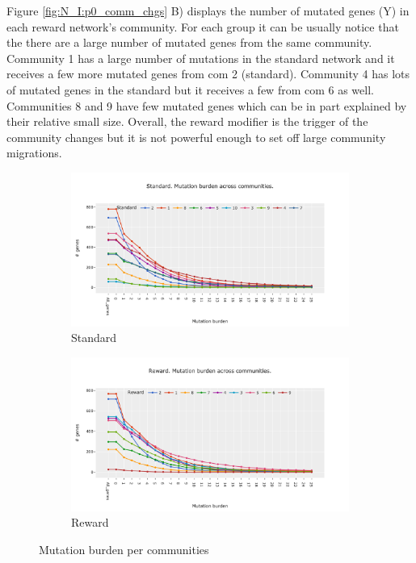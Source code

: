 {Figure \ref{fig:N_I:p0_comm_chgs} B) displays the number of mutated genes (Y) in each reward network's community. For each group it can be usually notice that the there are a large number of mutated genes from the same community. Community 1 has a large number of mutations in the standard network and it receives a few more mutated genes from com 2 (standard). Community 4 has lots of mutated genes in the standard but it receives a few from com 6 as well. Communities 8 and 9 have few mutated genes which can be in part explained by their relative small size. Overall, the reward modifier is the trigger of the community changes but it is not powerful enough to set off large community migrations.


\begin{figure}[!htb]
    \hfill
    \begin{subfigure}[b]{0.49\textwidth}
        \centering
        \includegraphics[width=\textwidth,keepaspectratio]{Sections/Network_I/Resources/P0/Comms/Mut_evo_Std_4k_v3.png}
        \caption{Standard}
    \end{subfigure}
    \begin{subfigure}[b]{0.49\textwidth}
        \centering
        \includegraphics[width=\textwidth,keepaspectratio]{Sections/Network_I/Resources/P0/Comms/Mut_evo_Rwd_4k_v3.png}
        \caption{Reward}
    \end{subfigure}
    \caption{Mutation burden per communities}
    \label{fig:N_I:p0_mut_burden}
\end{figure}


}
